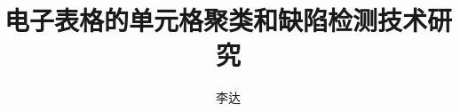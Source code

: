 \documentclass[master, macfonts, twoside]{njuthesis}
\title{电子表格的单元格聚类和缺陷检测技术研究}
\author{李达}
\institute{南京大学}
\begin{document}
\maketitle

\makeenglishtitle

\frontmatter





\tableofcontents
\listoffigures
\listoftables

\mainmatter














\backmatter


\end{document}

